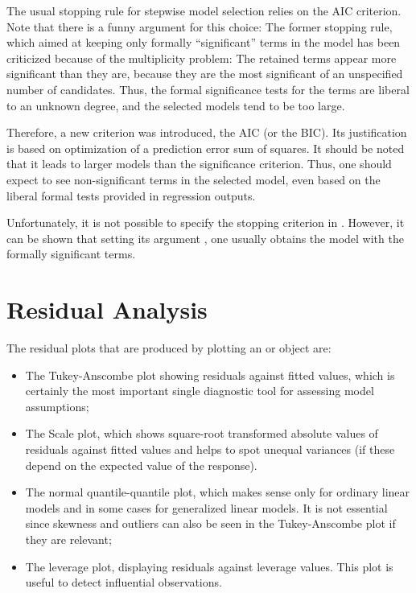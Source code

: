 \documentclass[11pt]{article}
\begin{document}
The usual stopping rule for stepwise model selection relies on the AIC
criterion. Note that there is a funny argument for this choice:
The former stopping rule, which aimed at keeping only formally
``significant'' terms in the model has been criticized because of the
multiplicity problem: The retained terms appear more significant than they
are, because they are the most significant of an unspecified number of
candidates. Thus, the formal significance tests for the terms are liberal
to an unknown degree, and the selected models tend to be too large.

Therefore, a new criterion was introduced, the AIC (or the BIC).
Its justification is based on optimization of a prediction error sum of 
squares. It should be noted that it leads to larger models than the
significance criterion. Thus, one should expect to see non-significant
terms in the selected model, even based on the liberal formal tests
provided in regression outputs.

Unfortunately, it is not possible to specify the stopping criterion 
in . However, it can be shown that setting its argument ,
one usually obtains the model with the formally significant terms.


\Vneed{50mm}
\section{Residual Analysis}
The residual plots that are produced by plotting an  or 
object are: 
\begin{itemize}
\item 
The Tukey-Anscombe plot showing residuals against fitted values,
which is certainly the most important single diagnostic tool for assessing
model assumptions;
\item
The Scale plot, which shows square-root transformed absolute values of
residuals against 
fitted values and helps to spot unequal variances (if these depend on the
expected value of the response).
\item
The normal quantile-quantile plot, which makes sense only for ordinary
linear models and in some cases for generalized linear models. 
It is not essential since skewness and outliers can also be seen in the
Tukey-Anscombe plot if they are relevant;
\item
The leverage plot, displaying residuals against leverage values.
This plot is useful to detect influential observations.
\end{itemize}
\end{document}
